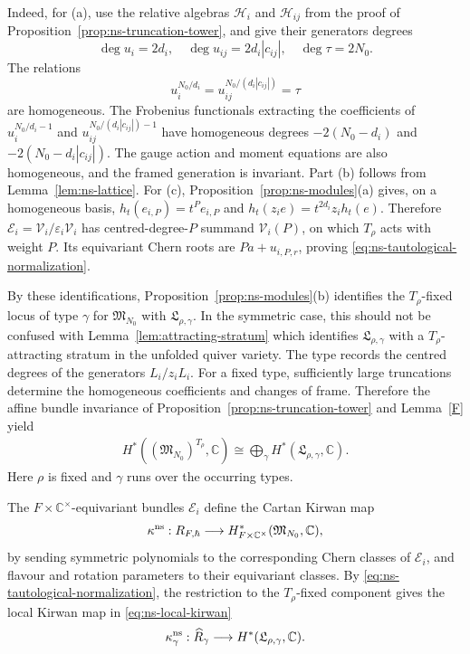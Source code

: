 \documentclass[11pt,reqno]{amsart}
\theoremstyle{definition}
\theoremstyle{remark}
\def\bbC{\mathbb C}
\def\calV{\mathcal V}
\begin{document}
Indeed, for (a), use the relative algebras $\mathcal H_i$ and
$\mathcal H_{ij}$ from the proof of
Proposition~\ref{prop:ns-truncation-tower}, and give their generators
degrees
\[
 \deg u_i=2d_i,\quad
 \deg u_{ij}=2d_i|c_{ij}|,\quad \deg\tau=2N_0.
\]
The relations 
$$u_i^{N_0/d_i}=u_{ij}^{N_0/(d_i|c_{ij}|)}=\tau$$ are homogeneous.
The Frobenius functionals extracting the coefficients of
$u_i^{N_0/d_i-1}$ and $u_{ij}^{N_0/(d_i|c_{ij}|)-1}$ have
homogeneous degrees $-2(N_0-d_i)$ and $-2(N_0-d_i|c_{ij}|)$. 
The gauge action and moment equations
are also homogeneous, and the framed generation is invariant.
Part (b) follows from Lemma~\ref{lem:ns-lattice}.
For (c), Proposition~\ref{prop:ns-modules}(a) gives, on a
homogeneous basis, $h_t(e_{i,P})=t^Pe_{i,P}$ and
$h_t(z_ie)=t^{2d_i}z_ih_t(e)$. Therefore
$\mathcal E_i=\mathcal V_i/\varepsilon_i\mathcal V_i$ has
centred-degree-$P$ summand $\calV_i(P)$, on which $T_\rho$
acts with weight $P$. Its equivariant Chern roots are
$Pa+u_{i,P,r}$, proving \eqref{eq:ns-tautological-normalization}.


By these identifications, Proposition~\ref{prop:ns-modules}(b)
identifies the $T_\rho$-fixed locus  of type $\gamma$ for  $\mathfrak M_{N_0}$ with $\mathfrak L_{\rho,\gamma}$. 
In the symmetric case, this should not be confused with
Lemma~\ref{lem:attracting-stratum} which identifies
$\mathfrak L_{\rho,\gamma}$ with a $T_\rho$-{attracting stratum}
in the unfolded quiver variety. The type records the centred degrees of the generators
$L_i/z_iL_i$. For a fixed type, sufficiently large truncations
determine the homogeneous coefficients and changes of frame.
Therefore the  affine bundle invariance of Proposition~\ref{prop:ns-truncation-tower}
and Lemma~\ref{F} yield
\begin{equation}\label{eq:ns-fixed-cohomology}
 \begin{aligned}
 H^*((\mathfrak M_{N_0})^{T_\rho},\bbC)
 \cong\bigoplus_\gamma H^*(\mathfrak L_{\rho,\gamma},\bbC).
 \end{aligned}
\end{equation}
Here $\rho$ is fixed and $\gamma$ runs over the occurring types.

The $F\times\bbC^\times$-equivariant bundles $\mathcal E_i$ define the
Cartan Kirwan map
\begin{equation}\label{eq:ns-global-kirwan}
 \kappa^{\rm ns}:R_{F,\hbar}\longrightarrow
 H^*_{F\times\bbC^\times}(\mathfrak M_{N_0},\bbC),
\end{equation}
by sending symmetric polynomials to the corresponding
Chern classes of $\mathcal E_i$, and flavour and rotation parameters
to their equivariant classes. By
\eqref{eq:ns-tautological-normalization}, the restriction to the
$T_\rho$-fixed component gives the local Kirwan map in \eqref{eq:ns-local-kirwan}
\[
 \kappa^{\rm ns}_\gamma:\widehat R_\gamma\longrightarrow
 H^*(\mathfrak L_{\rho,\gamma},\bbC).
\]
\end{document}
